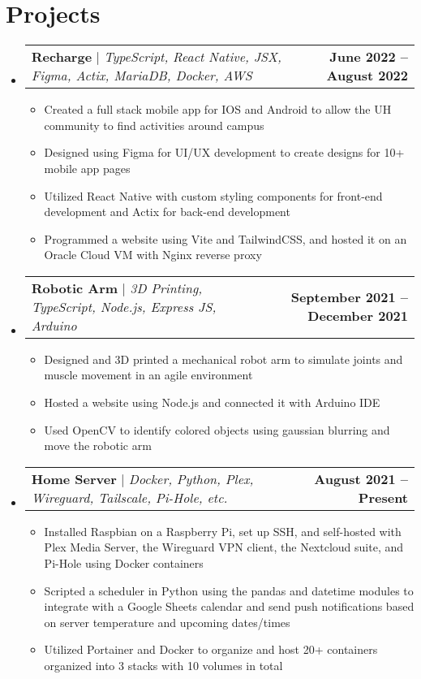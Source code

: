\documentclass[letterpaper,11pt]{article}
\makeatletter
\newcommand{\resumeItem}[1]{
  \item\small{
    {#1 \vspace{-2pt}}
  }
}
\newcommand{\resumeProjectHeading}[2]{
    \item
    \begin{tabular*}{1.001\textwidth}{l@{\extracolsep{\fill}}r}
      \small#1 & \textbf{\small #2}\\
    \end{tabular*}\vspace{-7pt}
}
\newcommand{\resumeSubHeadingListStart}{\begin{itemize}[leftmargin=0.0in, label={}]}
\newcommand{\resumeSubHeadingListEnd}{\end{itemize}}
\newcommand{\resumeItemListStart}{\begin{itemize}}
\newcommand{\resumeItemListEnd}{\end{itemize}\vspace{-5pt}}
\makeatother
\begin{document}
\section{Projects}
    \vspace{-5pt}
    \resumeSubHeadingListStart
      \resumeProjectHeading
          {\textbf{Recharge} $|$ \emph{TypeScript, React Native, JSX, Figma, Actix, MariaDB, Docker, AWS}}{June 2022 -- August 2022}
          \resumeItemListStart
            \resumeItem{Created a full stack mobile app for IOS and Android to allow the UH community to find activities around campus}
            \resumeItem{Designed using Figma for UI/UX development to create designs for 10+ mobile app pages}
            \resumeItem{Utilized React Native with custom styling components for front-end development and Actix for back-end development}
            \resumeItem{Programmed a website using Vite and TailwindCSS, and hosted it on an Oracle Cloud VM with Nginx reverse proxy}
          \resumeItemListEnd
          \vspace{-13pt}
      \resumeProjectHeading
          {\textbf{Robotic Arm} $|$ \emph{3D Printing, TypeScript, Node.js, Express JS, Arduino}}{September 2021 -- December 2021}
          \resumeItemListStart
            \resumeItem{Designed and 3D printed a mechanical robot arm to simulate joints and muscle movement in an agile environment}
            \resumeItem{Hosted a website using Node.js and connected it with Arduino IDE}
            \resumeItem{Used OpenCV to identify colored objects using gaussian blurring and move the robotic arm}
          \resumeItemListEnd 
          \vspace{-13pt}
          \resumeProjectHeading
          {\textbf{Home Server} $|$ \emph{Docker, Python, Plex, Wireguard, Tailscale, Pi-Hole, etc.}}{August 2021 -- Present}
          \resumeItemListStart
            \resumeItem{Installed Raspbian on a Raspberry Pi, set up SSH, and self-hosted with Plex Media Server, the Wireguard VPN client, the Nextcloud suite, and Pi-Hole using Docker containers}
            \resumeItem{Scripted a scheduler in Python using the pandas and datetime modules to integrate with a Google Sheets calendar and send push notifications based on server temperature and upcoming dates/times}
            \resumeItem{Utilized Portainer and Docker to organize and host 20+ containers organized into 3 stacks with 10 volumes in total}
          \resumeItemListEnd 
    \resumeSubHeadingListEnd
\vspace{-15pt}
\end{document}
